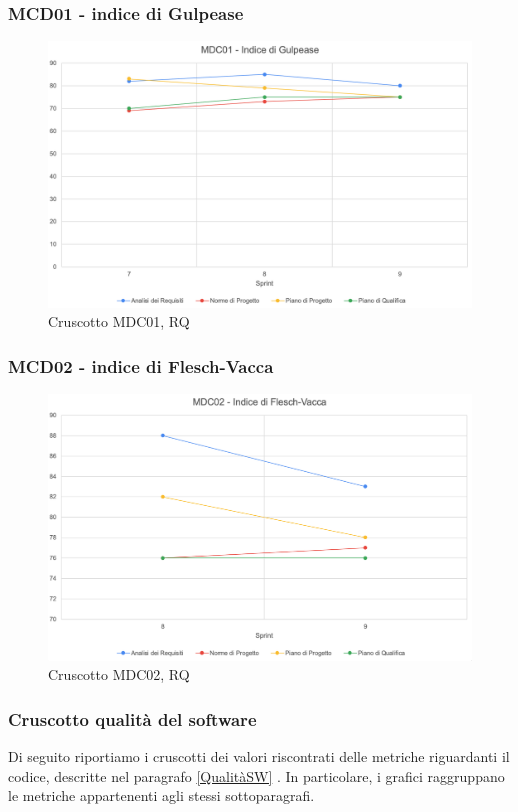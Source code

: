 \subsubsection*{MCD01 - indice di Gulpease}
\begin{figure}[H]
    \centering
    \includegraphics[scale = 0.5]{immagini/GulpeaseRQ.png}
    \caption{Cruscotto MDC01, RQ}
\end{figure}

\subsubsection*{MCD02 - indice di Flesch-Vacca}
\begin{figure}[H]
    \centering
    \includegraphics[scale = 0.5]{immagini/fleschRQ.png}
    \caption{Cruscotto MDC02, RQ}
\end{figure}
\newpage
\subsubsection{Cruscotto  qualità del software}
Di seguito riportiamo i cruscotti dei valori riscontrati delle metriche riguardanti il codice, descritte nel paragrafo \ref{QualitàSW} . In particolare, i grafici raggruppano le metriche appartenenti agli stessi sottoparagrafi.

